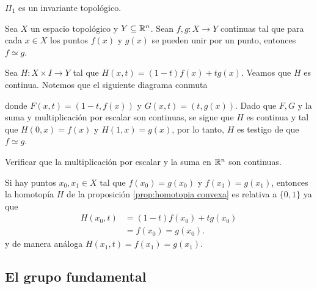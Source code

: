     \begin{coro}
        $\Pi_1$ es un invariante topológico.
    \end{coro}
    \begin{prop}
        \label{prop:homotopia convexa}
        Sea $X$ un espacio topológico y $Y\subseteq\mathbb{R}^n$. Sean $f,g:X\to Y$ continuas tal que para cada $x\in X$ los puntos $f(x)$ y $g(x)$ se pueden unir por un punto, entonces $f\simeq g$.
    \end{prop}
    \begin{dem}
        Sea $H:X\times I\to Y$ tal que $H(x,t)=(1-t)f(x)+tg(x).$ Veamos que $H$ es continua.
    Notemos que el siguiente diagrama conmuta
    \begin{center}
    \end{center}
    donde $F(x,t)=(1-t,f(x))$ y $G(x,t)=(t,g(x)).$ Dado que $F,G$ y la suma y multiplicación por escalar son continuas, se sigue que $H$ es continua y tal que $H(0,x)=f(x)$ y $H(1,x)=g(x)$, por lo tanto, $H$ es testigo de que $f\simeq g$.
    \end{dem}
    \begin{ejercicio}
        Verificar que la multiplicación por escalar y la suma en $\mathbb{R}^n$ son continuas.
    \end{ejercicio}
    \begin{nota}
    \label{nota:homotopia_convexa}
        Si hay puntos $x_0,x_1\in X$ tal que $f(x_0)=g(x_0)$ y $f(x_1)=g(x_1)$, entonces la homotopía $H$ de la proposición \ref{prop:homotopia convexa} es relativa a $\{0,1\}$ ya que 
        \begin{align*}
            H(x_0,t)&=(1-t)f(x_0)+tg(x_0)\\
            &=f(x_0)=g(x_0).
        \end{align*}
        y de manera análoga $H(x_1,t)=f(x_1)=g(x_1).$
    \end{nota}
    
    \subsection{El grupo fundamental}
    
